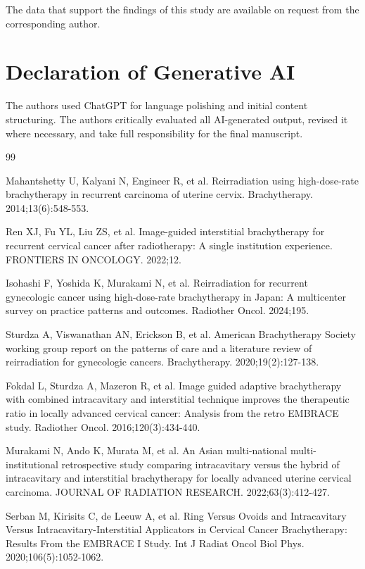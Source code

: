 \documentclass[12pt,twoside,letterpaper]{article}
\begin{document}
The data that support the findings of this study are available on request from the corresponding author.

\section*{Declaration of Generative AI}

The authors used ChatGPT for language polishing and initial content structuring. The authors critically evaluated all AI-generated output, revised it where necessary, and take full responsibility for the final manuscript.

\begingroup


\begin{thebibliography}{99}

 Mahantshetty U, Kalyani N, Engineer R, et al. Reirradiation using high-dose-rate brachytherapy in recurrent carcinoma of uterine cervix. Brachytherapy. 2014;13(6):548-553.

 Ren XJ, Fu YL, Liu ZS, et al. Image-guided interstitial brachytherapy for recurrent cervical cancer after radiotherapy: A single institution experience. FRONTIERS IN ONCOLOGY. 2022;12.

 Isohashi F, Yoshida K, Murakami N, et al. Reirradiation for recurrent gynecologic cancer using high-dose-rate brachytherapy in Japan: A multicenter survey on practice patterns and outcomes. Radiother Oncol. 2024;195.

 Sturdza A, Viswanathan AN, Erickson B, et al. American Brachytherapy Society working group report on the patterns of care and a literature review of reirradiation for gynecologic cancers. Brachytherapy. 2020;19(2):127-138.

 Fokdal L, Sturdza A, Mazeron R, et al. Image guided adaptive brachytherapy with combined intracavitary and interstitial technique improves the therapeutic ratio in locally advanced cervical cancer: Analysis from the retro EMBRACE study. Radiother Oncol. 2016;120(3):434-440.

 Murakami N, Ando K, Murata M, et al. An Asian multi-national multi-institutional retrospective study comparing intracavitary versus the hybrid of intracavitary and interstitial brachytherapy for locally advanced uterine cervical carcinoma. JOURNAL OF RADIATION RESEARCH. 2022;63(3):412-427.

 Serban M, Kirisits C, de Leeuw A, et al. Ring Versus Ovoids and Intracavitary Versus Intracavitary-Interstitial Applicators in Cervical Cancer Brachytherapy: Results From the EMBRACE I Study. Int J Radiat Oncol Biol Phys. 2020;106(5):1052-1062.


\end{thebibliography}
\end{document}
